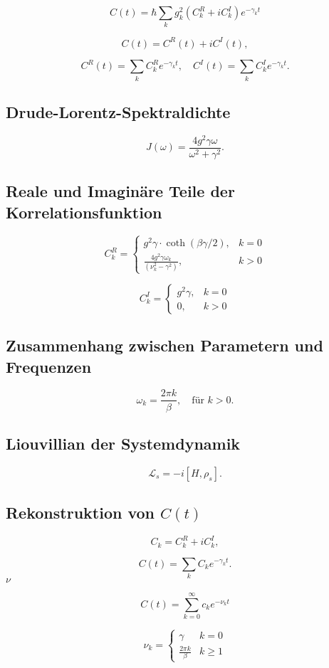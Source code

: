 \documentclass{article}
\begin{document}
\[
C(t) = \hbar \sum_k g_k^2 \left( C^R_k + i C^I_k \right) e^{-\gamma_k t}
\]

\[
C(t) = C^R(t) + i C^I(t),
\]

\[
C^R(t) = \sum_k C_k^R e^{-\gamma_k t}, \quad C^I(t) = \sum_k C_k^I e^{-\gamma_k t}.
\]

\subsection*{Drude-Lorentz-Spektraldichte}
\[
J(\omega) = \frac{4 g^2 \gamma \omega}{\omega^2 + \gamma^2}.
\]

\subsection*{Reale und Imaginäre Teile der Korrelationsfunktion}
\[
C_k^R = 
\begin{cases} 
g^2 \gamma \cdot \coth(\beta \gamma / 2), & k = 0 \\
\frac{4 g^2 \gamma \omega_k}{(\nu_k^2 - \gamma^2)}, & k > 0
\end{cases}
\]

\[
C_k^I = 
\begin{cases} 
g^2 \gamma, & k = 0 \\
0, & k > 0
\end{cases}
\]

\subsection*{Zusammenhang zwischen Parametern und Frequenzen}
\[
\omega_k = \frac{2 \pi k}{\beta}, \quad \text{für } k > 0.
\]

\subsection*{Liouvillian der Systemdynamik}
\[
\mathcal{L}_s = -i [H, \rho_s].
\]

\subsection*{Rekonstruktion von \( C(t) \)}
\[
C_k = C_k^R + i C_k^I,
\]

\[
C(t) = \sum_k C_k e^{-\gamma_k t}.
\]
$\nu$



\[
C(t) = \sum_{k=0}^\infty c_k e^{-\nu_k t}
\]

\[
\nu_k = 
\begin{cases} 
\gamma & k = 0 \\
\frac{2\pi k}{\beta} & k \geq 1
\end{cases}
\]
\end{document}
